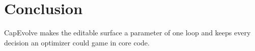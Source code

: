 \section{Conclusion}
\label{sec:v2:conclusion}

CapEvolve makes the editable surface a parameter of one loop and keeps every decision an optimizer could game in core code. 
